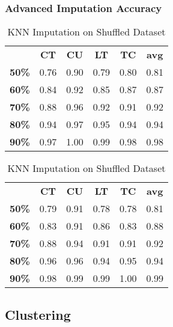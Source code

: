 \documentclass{article}
\begin{document}
\subsubsection{Advanced Imputation Accuracy}
\begin{table}[h]
\begin{minipage}{.45\textwidth}\centering
\begin{tabular}{cccccc}
			  & \textbf{CT} & \textbf{CU} & \textbf{LT} & \textbf{TC} & \textbf{avg} \\
\textbf{50\%} & 0.76        & 0.90        & 0.79        & 0.80        & 0.81 \\
\textbf{60\%} & 0.84        & 0.92        & 0.85        & 0.87        & 0.87 \\
\textbf{70\%} & 0.88        & 0.96        & 0.92        & 0.91        & 0.92 \\
\textbf{80\%} & 0.94        & 0.97        & 0.95        & 0.94        & 0.94 \\
\textbf{90\%} & 0.97        & 1.00        & 0.99        & 0.98        & 0.98
\end{tabular}
\caption{KNN Imputation}
\end{minipage}
\hfill
\begin{minipage}{.5\textwidth}\centering
\begin{tabular}{cccccc}
			  & \textbf{CT} & \textbf{CU} & \textbf{LT} & \textbf{TC} & \textbf{avg} \\
\textbf{50\%} & 0.79        & 0.91        & 0.78        & 0.78        & 0.81 \\
\textbf{60\%} & 0.83        & 0.91        & 0.86        & 0.83        & 0.88 \\
\textbf{70\%} & 0.88        & 0.94        & 0.91        & 0.91        & 0.92 \\
\textbf{80\%} & 0.96        & 0.96        & 0.94        & 0.95        & 0.94 \\
\textbf{90\%} & 0.98        & 0.99        & 0.99        & 1.00        & 0.99
\end{tabular}
\caption{KNN Imputation on Shuffled Dataset}
\end{minipage}
\end{table}

\subsection{Clustering}
\end{document}
